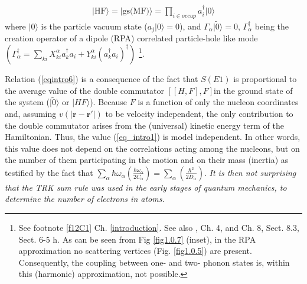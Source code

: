 \begin{align}
|\text{HF}\rangle=|\text{gs(MF)}\rangle=\prod_{i\in occup}a^\dagger_i |0\rangle
\end{align}
where $|0\rangle$ is the particle vacuum state ($a_j|0\rangle=0$), and $\Gamma_\alpha|\tilde 0\rangle=0$, $\Gamma^\dagger_\alpha$ being the creation operator of a dipole  (RPA) correlated particle-hole like mode $(\Gamma_\alpha^\dagger=\sum_{ki}X_{ki}^\alpha a_k^\dagger a_i+Y^\alpha_{ki}(a_k^\dagger a_i)^\dagger)$ \footnote{See footnote \ref{f12C1} Ch. \ref{introduction}. See also \cite{Bertsch:05}, Ch. 4, and \cite{Brink:05} Ch. 8, Sect. 8.3, \cite{Bohr:75} Sect. 6-5 h. As can be seen from Fig  \ref{fig1.0.7} (inset), in the RPA approximation no scattering vertices (Fig. \ref{fig1.0.5}) are present. Consequently, the coupling between one- and two- phonon states is, within this (harmonic) approximation, not possible.}. 


Relation (\ref{eqintro6}) is a consequence of the fact that $S(E1)$ is proportional to the average value of the double  commutator $[[H,F],F]$in the ground state of the system ($|\tilde 0\rangle$ or $|HF\rangle$). Because $F$ is a function of only the nucleon coordinates and, assuming $v(|\mathbf{r}-\mathbf{r}'|)$ to be velocity independent, the only contribution to the double commutator arises from the (universal) kinetic energy term of the Hamiltonian. Thus, the value (\ref{eq_intro1}) is model independent. In other words, this value does not depend on the correlations acting among the nucleons, but on the number of them participating in the motion and on their mass (inertia) as testified by the fact that $\sum_{\alpha}\hbar \omega_\alpha\left(\frac{\hbar\omega_\alpha}{2C_\alpha}\right)=\sum_{\alpha}\left(\frac{\hbar^2}{2D_\alpha}\right)$. \textit{It is then not surprising that the TRK sum rule was used in the early stages of quantum mechanics, to determine the number of electrons in atoms.}

